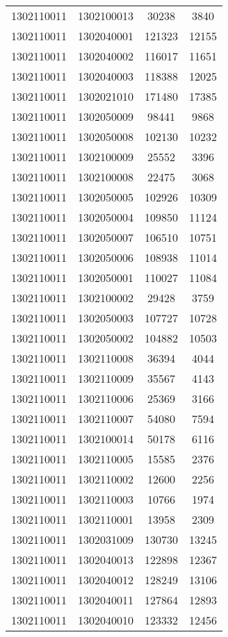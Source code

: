 \begin{longtable}[h]{llcc}
		1302110011 & 1302100013 & 30238 & 3840\\
		1302110011 & 1302040001 & 121323 & 12155\\
		1302110011 & 1302040002 & 116017 & 11651\\
		1302110011 & 1302040003 & 118388 & 12025\\
		1302110011 & 1302021010 & 171480 & 17385\\
		1302110011 & 1302050009 & 98441 & 9868\\
		1302110011 & 1302050008 & 102130 & 10232\\
		1302110011 & 1302100009 & 25552 & 3396\\
		1302110011 & 1302100008 & 22475 & 3068\\
		1302110011 & 1302050005 & 102926 & 10309\\
		1302110011 & 1302050004 & 109850 & 11124\\
		1302110011 & 1302050007 & 106510 & 10751\\
		1302110011 & 1302050006 & 108938 & 11014\\
		1302110011 & 1302050001 & 110027 & 11084\\
		1302110011 & 1302100002 & 29428 & 3759\\
		1302110011 & 1302050003 & 107727 & 10728\\
		1302110011 & 1302050002 & 104882 & 10503\\
		1302110011 & 1302110008 & 36394 & 4044\\
		1302110011 & 1302110009 & 35567 & 4143\\
		1302110011 & 1302110006 & 25369 & 3166\\
		1302110011 & 1302110007 & 54080 & 7594\\
		1302110011 & 1302100014 & 50178 & 6116\\
		1302110011 & 1302110005 & 15585 & 2376\\
		1302110011 & 1302110002 & 12600 & 2256\\
		1302110011 & 1302110003 & 10766 & 1974\\
		1302110011 & 1302110001 & 13958 & 2309\\
		1302110011 & 1302031009 & 130730 & 13245\\
		1302110011 & 1302040013 & 122898 & 12367\\
		1302110011 & 1302040012 & 128249 & 13106\\
		1302110011 & 1302040011 & 127864 & 12893\\
		1302110011 & 1302040010 & 123332 & 12456\\

\end{longtable}
